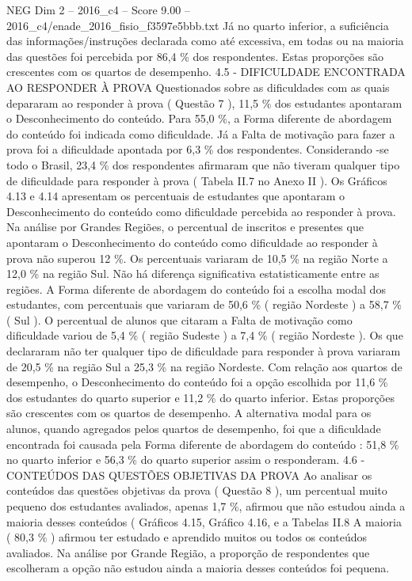 \begin{textsample}{NEG Dim 2 – 2016\_c4 – Score 9.00 – 2016\_c4/enade\_2016\_fisio\_f3597e5bbb.txt}
Já no quarto inferior, a suficiência das informações/instruções declarada como até excessiva, em todas ou na maioria das questões foi percebida por 86,4 \% dos respondentes.
Estas proporções são crescentes com os quartos de desempenho. 4.5 - DIFICULDADE ENCONTRADA AO RESPONDER À PROVA Questionados sobre as dificuldades com as quais depararam ao responder à prova ( Questão 7 ), 11,5 \% dos estudantes apontaram o Desconhecimento do conteúdo.
Para 55,0 \%, a Forma diferente de abordagem do conteúdo foi indicada como dificuldade.
Já a Falta de motivação para fazer a prova foi a dificuldade apontada por 6,3 \% dos respondentes.
Considerando -se todo o Brasil, 23,4 \% dos respondentes afirmaram que não tiveram qualquer tipo de dificuldade para responder à prova ( Tabela II.7 no Anexo II ).
Os Gráficos 4.13 e 4.14 apresentam os percentuais de estudantes que apontaram o Desconhecimento do conteúdo como dificuldade percebida ao responder à prova.
Na análise por Grandes Regiões, o percentual de inscritos e presentes que apontaram o Desconhecimento do conteúdo como dificuldade ao responder à prova não superou 12 \%.
Os percentuais variaram de 10,5 \% na região Norte a 12,0 \% na região Sul.
Não há diferença significativa estatisticamente entre as regiões.
A Forma diferente de abordagem do conteúdo foi a escolha modal dos estudantes, com percentuais que variaram de 50,6 \% ( região Nordeste ) a 58,7 \% ( Sul ).
O percentual de alunos que citaram a Falta de motivação como dificuldade variou de 5,4 \% ( região Sudeste ) a 7,4 \% ( região Nordeste ).
Os que declararam não ter qualquer tipo de dificuldade para responder à prova variaram de 20,5 \% na região Sul a 25,3 \% na região Nordeste.
Com relação aos quartos de desempenho, o Desconhecimento do conteúdo foi a opção escolhida por 11,6 \% dos estudantes do quarto superior e 11,2 \% do quarto inferior.
Estas proporções são crescentes com os quartos de desempenho.
A alternativa modal para os alunos, quando agregados pelos quartos de desempenho, foi que a dificuldade encontrada foi causada pela Forma diferente de abordagem do conteúdo : 51,8 \% no quarto inferior e 56,3 \% do quarto superior assim o responderam. 4.6 - CONTEÚDOS DAS QUESTÕES OBJETIVAS DA PROVA Ao analisar os conteúdos das questões objetivas da prova ( Questão 8 ), um percentual muito pequeno dos estudantes avaliados, apenas 1,7 \%, afirmou que não estudou ainda a maioria desses conteúdos ( Gráficos 4.15, Gráfico 4.16, e a Tabelas II.8 A maioria ( 80,3 \% ) afirmou ter estudado e aprendido muitos ou todos os conteúdos avaliados.
Na análise por Grande Região, a proporção de respondentes que escolheram a opção não estudou ainda a maioria desses conteúdos foi pequena.

\end{textsample}
